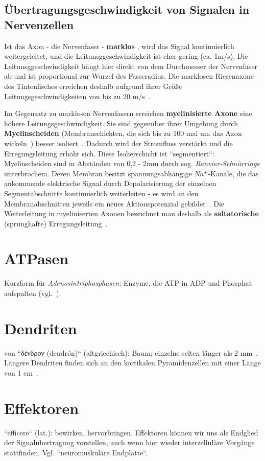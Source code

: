 \subsection{Übertragungsgeschwindigkeit von Signalen in Nervenzellen}
Ist das Axon - die Nervenfaser - \textbf{marklos} , wird das Signal kontinuierlich weitergeleitet, und die Leitunsggeschwindigkeit ist eher gering (ca. 1m/s).
Die Leitunsggeschwindigkeit hängt hier direkt von dem Durchmesser der Nervenfaser ab und ist proportional zur Wurzel des Fasseradius.
Die marklosen Riesenaxone des Tintenfisches erreichen deshalb aufgrund ihrer Größe Leitungsgeschwindigkeiten von bis zu 20 m/s~\cite[79]{Jon19}.

Im Gegensatz zu marklosen Nervenfasern erreichen \textbf{myelinisierte Axone}  eine höhere Leitungsgeschwindigkeit.
Sie sind gegenüber ihrer Umgebung durch \textbf{Myelinscheiden}  (Membranschichten, die sich bis zu 100 mal um das Axon wickeln~\cite[79]{Jon19}) besser isoliert~\cite[48]{SD07}.
Dadurch wird der Stromfluss verstärkt und die Erregungsleitung erhöht sich.
Diese Isolierschicht ist ``segmentiert``: Myelinscheiden sind in Abständen von 0,2 - 2mm durch sog.  \textit{Ranvier-Schnürringe} unterbrochem.
Deren Membran besitzt spannungsabhängige $Na^+$-Kanäle, die das ankommende elektrische Signal durch  Depolarisierung der einzelnen Segmentabschnitte kontinuierlich weiterleiten - es wird an den Membranabschnitten jeweils ein neues Aktionspotenzial gebildet~\cite[48]{SD07}.
Die Weiterleitung in myeliniserten Axonen bezeichnet man deshalb als \textbf{saltatorische} (sprunghafte) Erregungsleitung~\cite[109 f.]{BCP18}.

\section{ATPasen}\label{appendix:atpasen}
Kurzform für \textit{Adenosintriphosphasen}: Enzyme, die ATP in ADP und Phosphat aufspalten (vgl.~\cite[26]{SD07}).

\section{Dendriten}\label{appendix:dendriten}
von ``\textgreek{δένδρον} (dendrón)`` (altgriechisch): Baum; einzelne selten länger als 2 mm~\cite[28]{BCP18}.
Längere Dendriten finden sich an den kortikalen Pyramidenzellen mit einer Länge von 1 cm~\cite[58]{Eil19}.

\section{Effektoren}
``efficere`` (lat.): bewirken, hervorbringen.
Effektoren können wir uns als Endglied der Signalübertragung vorstellen, auch wenn hier wieder interzelluläre Vorgänge stattfinden. Vgl. ``neuromuskuläre Endplatte``\cite[127, Abs. 3]{BCP18}.

